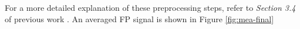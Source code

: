 \documentclass{report}
\begin{document}
    For a more detailed explanation of these preprocessing steps, refer to \textit{Section 3.4} of previous work \cite{Sarwar2024}. An averaged FP signal is shown in Figure \ref{fig:mea-final}

    
\end{document}
